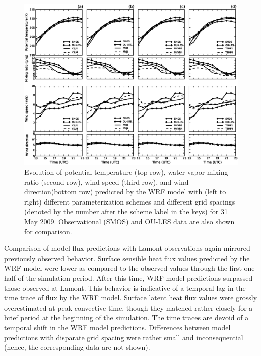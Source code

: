 \begin{figure}[ht!]
\begin{center}
\includegraphics[width=\textwidth]{figures/chapter4/meteogram_grid_20090531}
\end{center}
\caption{Evolution of potential temperature (top row), water vapor mixing ratio (second row), wind speed (third row), and wind direction(bottom row) predicted by the WRF model with (left to right) different parameterization schemes and different grid spacings (denoted by the number after the scheme label in the keys) for 31 May 2009. Observational (SMOS) and OU-LES data are also shown for comparison.}
\label{figure436}
\end{figure}


Comparison of model flux predictions with Lamont observations again mirrored previously observed behavior. Surface sensible heat flux values predicted by the WRF model were lower as compared to the observed values through the first one-half of the simulation period. After this time, WRF model predictions surpassed those observed at Lamont. This behavior is indicative of a temporal lag in the time trace of flux by the WRF model. Surface latent heat flux values were grossly overestimated at peak convective time, though they matched rather closely for a brief period at the beginning of the simulation. The time traces are devoid of a temporal shift in the WRF model predictions. Differences between model predictions with disparate grid spacing were rather small and inconsequential (hence, the corresponding data are not shown). 

